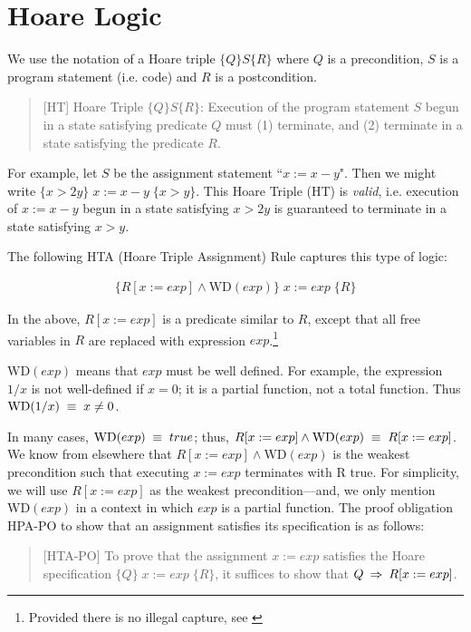 \documentclass[runningheads,12pt]{article}
\def\WD{\textrm{WD}}
\begin{document}

\section{Hoare Logic}

 We use the notation of a Hoare triple $\{Q\} S \{R\}$ where $Q$ is a precondition, $S$ is a program statement (i.e. code) and $R$ is a postcondition. 

\begin{quote}
[HT] Hoare Triple $\{Q\} S \{R\}$: Execution of the program statement $S$ begun in a state satisfying predicate $Q$ must (1) terminate, and (2) terminate in a state satisfying the predicate $R$. 	
\end{quote}

For example, let $S$ be the assignment statement ``$x := x - y$". Then we might write $\{x > 2y\}\; x := x - y \;\{x > y\}$. This Hoare Triple (HT) is \textit{valid}, i.e. execution of $x := x - y$ begun in a state satisfying $x > 2y$ is guaranteed to terminate in a state satisfying $x > y$.

The following HTA (Hoare Triple Assignment) Rule captures this type of logic:

\begin{gather}
\{R[x := exp] \land \WD(exp)\}\; x := exp \;\{R\} \tag{HTA}
\end{gather}

\noindent In the above, $R[x := exp]$ is a predicate similar to $R$, except that all free variables in $R$ are replaced with expression $exp$.\footnote{Provided there is no illegal capture, see \cite{Tourlakis2008}} 

$\WD(exp)$ means that $exp$ must be well defined. For example, the expression $1/x$ is not well-defined if $x=0$; it is a partial function, not a total function. Thus $\WD(1/x) \1\equiv x \neq 0$.

In many cases, $\WD(exp) \1\equiv true$; thus, $R[x := exp] \land \WD(exp) \1\equiv  R[x := exp]$. We know from elsewhere that $R[x := exp] \land \WD(exp)$ is the weakest precondition such that executing $x := exp$ terminates with R true. For simplicity, we will use $R[x := exp]$ as the weakest precondition---and, we only mention $\WD(exp)$ in a context in which $exp$ is a partial function. The proof obligation HPA-PO to show that an assignment satisfies its specification is as follows:
\begin{quote}
[HTA-PO] To prove that the assignment $x := exp$ satisfies the Hoare specification $\{Q\}\; x := exp \;\{R\}$, it suffices to show that $Q \; \mathbin\Rightarrow \; R[x :=exp]$. 
%
\end{quote}
\end{document}
